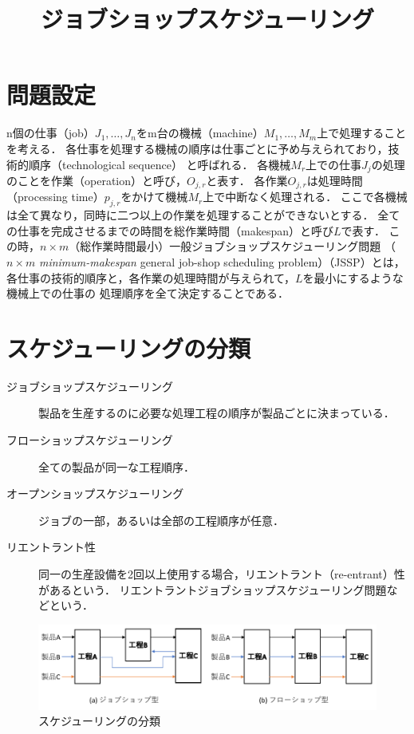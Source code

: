 \documentclass{jsarticle}
\begin{document}
\title{ジョブショップスケジューリング}
\author{}

\maketitle

\section{問題設定}
n個の仕事（job）$J_1,\dots,J_n$をm台の機械（machine）$M_1,\dots,M_m$上で処理することを考える．
各仕事を処理する機械の順序は仕事ごとに予め与えられており，技術的順序（technological sequence）
と呼ばれる．
各機械$M_r$上での仕事$J_j$の処理のことを作業（operation）と呼び，$O_{j,r}$と表す．
各作業$O_{j,r}$は処理時間（processing time）$p_{j,r}$をかけて機械$M_r$上で中断なく処理される．
ここで各機械は全て異なり，同時に二つ以上の作業を処理することができないとする．
全ての仕事を完成させるまでの時間を総作業時間（makespan）と呼び$L$で表す．
この時，$n\times m$（総作業時間最小）一般ジョブショップスケジューリング問題
（$n \times m$ \textit{minimum-makespan} general job-shop scheduling problem）（JSSP）とは，
各仕事の技術的順序と，各作業の処理時間が与えられて，$L$を最小にするような機械上での仕事の
処理順序を全て決定することである．

\section{スケジューリングの分類}
\begin{description}
	\item[ジョブショップスケジューリング] 
		製品を生産するのに必要な処理工程の順序が製品ごとに決まっている．
	\item[フローショップスケジューリング]
		全ての製品が同一な工程順序．
	\item[オープンショップスケジューリング]
		ジョブの一部，あるいは全部の工程順序が任意．
	\item[リエントラント性]
		同一の生産設備を2回以上使用する場合，リエントラント（re-entrant）性があるという．
		リエントラントジョブショップスケジューリング問題などという．
\end{description}

\begin{figure}[H]
	\centering
	\includegraphics{figures/job_n_flow.pdf}
	\caption{スケジューリングの分類}
	\label{fig:job_n_flow}
\end{figure}
\end{document}
